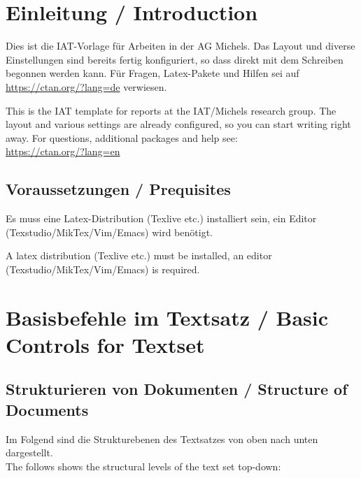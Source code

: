 \documentclass[]{iat}
\begin{document}
	\graphicspath{{./project_graphics/}}


\pagestyle{iat}
\tableofcontents
\chapter{Einleitung / Introduction}
\setcounter{page}{1}
Dies ist die IAT-Vorlage für Arbeiten in der AG Michels. Das Layout und diverse Einstellungen sind bereits fertig konfiguriert, so dass direkt mit dem Schreiben begonnen werden kann. Für Fragen, Latex-Pakete und Hilfen sei auf\\
\url{https://ctan.org/?lang=de} verwiesen. \par
This is the IAT template for reports at the IAT/Michels research group. The layout and various settings are already configured, so you can start writing right away. For questions, additional packages and help see:\\
\url{https://ctan.org/?lang=en}

\section{Voraussetzungen / Prequisites}
Es muss eine Latex-Distribution (Texlive etc.) installiert sein, ein Editor (Texstudio/MikTex/Vim/Emacs) wird benötigt.
\par
A latex distribution (Texlive etc.) must be installed, an editor (Texstudio/MikTex/Vim/Emacs) is required.

\chapter{Basisbefehle im Textsatz / Basic Controls for Textset}
\section{Strukturieren von Dokumenten / Structure of Documents}
Im Folgend sind die Strukturebenen des Textsatzes von oben nach unten dargestellt.\\
The follows shows the structural levels of the text set top-down:
\end{document}
